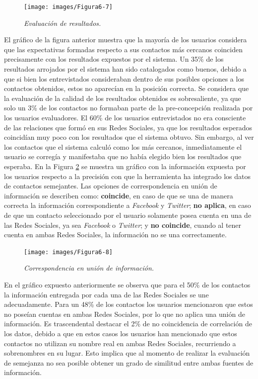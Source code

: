 \begin{figure}[H]
	\centering
	\texttt{[image: images/Figura6-7]}
	\caption{\em Evaluación de resultados.}
	\label{fig:ps-im7}
\end{figure}

El gráfico de la figura anterior muestra que la mayoría de los usuarios considera que las expectativas formadas respecto a sus contactos más cercanos coinciden precisamente con los resultados expuestos por el sistema. 
Un 35\% de los resultados arrojados por el sistema han sido catalogados como buenos, debido a que si bien los entrevistados consideraban dentro de sus posibles opciones a los contactos obtenidos, estos no aparecían en la posición correcta.
Se considera que la evaluación de la calidad de los resultados obtenidos es sobresaliente, ya que solo un 3\% de los contactos no formaban parte de la pre-concepción realizada por los usuarios evaluadores.
El 60\% de los usuarios entrevistados no era consciente de las relaciones que formó en sus Redes Sociales, ya que los resultados esperados coincidían muy poco con los resultados que el sistema obtuvo. Sin embargo, al ver los contactos que el sistema calculó como los más cercanos, inmediatamente el usuario se corregía y manifestaba que no había elegido bien los resultados que esperaba.
	En la Figura \ref{fig:ps-im8} se muestra un gráfico con la información expuesta por los usuarios respecto a la precisión con que la herramienta ha integrado los datos de contactos semejantes. Las opciones de correspondencia en unión de información se describen como: \textbf{coincide}, en caso de que se una de manera correcta la información correspondiente a \textit{Facebook} y \textit{Twitter}; \textbf{no aplica}, en caso de que un contacto seleccionado por el usuario solamente posea cuenta en una de las Redes Sociales, ya sea \textit{Facebook} o \textit{Twitter}; y \textbf{no coincide}, cuando al tener cuenta en ambas Redes Sociales, la información no se una correctamente.

\begin{figure}[H]
	\centering
	\texttt{[image: images/Figura6-8]}
	\caption{\em Correspondencia en unión de información.}
	\label{fig:ps-im8}
\end{figure}

En el gráfico expuesto anteriormente se observa que para el 50\% de los contactos la información entregada por cada una de las Redes Sociales se une adecuadamente. Para un 48\% de los contactos los usuarios mencionaron que estos no poseían cuentas en ambas Redes Sociales, por lo que no aplica una unión de información. 
Es trascendental destacar el 2\% de no coincidencia de correlación de los datos, debido a que en estos casos los usuarios han mencionado que estos contactos no utilizan su nombre real en ambas Redes Sociales, recurriendo a sobrenombres en su lugar. Esto implica que al momento de realizar la evaluación de semejanza no sea posible obtener un grado de similitud entre ambas fuentes de información.
  
